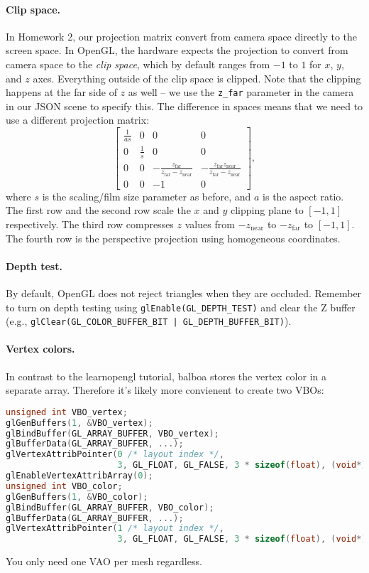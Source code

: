 \paragraph{Clip space.} In Homework 2, our projection matrix convert from camera space directly to the screen space. In OpenGL, the hardware expects the projection to convert from camera space to the \emph{clip space}, which by default ranges from $-1$ to $1$ for $x$, $y$, and $z$ axes. Everything outside of the clip space is clipped. Note that the clipping happens at the far side of $z$ as well -- we use the \lstinline{z_far} parameter in the camera in our JSON scene to specify this. The difference in spaces means that we need to use a different projection matrix:
\begin{equation}
\begin{bmatrix}
\frac{1}{as} & 0 & 0 & 0 \\
0 & \frac{1}{s} & 0 & 0 \\
0 & 0 & -\frac{z_{\text{far}}}{z_{\text{far}} - z_{\text{near}}} & -\frac{z_{\text{far}} z_{\text{near}}}{z_{\text{far}} - z_{\text{near}}} \\
0 & 0 & -1 & 0
\end{bmatrix},
\end{equation} 
where $s$ is the scaling/film size parameter as before, and $a$ is the aspect ratio. The first row and the second row scale the $x$ and $y$ clipping plane to $[-1, 1]$ respectively. The third row compresses $z$ values from $-z_{\text{near}}$ to $-z_{\text{far}}$ to $[-1, 1]$. The fourth row is the perspective projection using homogeneous coordinates.

\paragraph{Depth test.} By default, OpenGL does not reject triangles when they are occluded. Remember to turn on depth testing using \lstinline{glEnable(GL_DEPTH_TEST)} and clear the Z buffer (e.g., \lstinline{glClear(GL_COLOR_BUFFER_BIT | GL_DEPTH_BUFFER_BIT)}).

\paragraph{Vertex colors.} In contrast to the learnopengl tutorial, balboa stores the vertex color in a separate array. Therefore it's likely more convienent to create two VBOs:
\begin{lstlisting}[language=C++]
unsigned int VBO_vertex;
glGenBuffers(1, &VBO_vertex);
glBindBuffer(GL_ARRAY_BUFFER, VBO_vertex);
glBufferData(GL_ARRAY_BUFFER, ...);
glVertexAttribPointer(0 /* layout index */,
                      3, GL_FLOAT, GL_FALSE, 3 * sizeof(float), (void*)0);
glEnableVertexAttribArray(0);
unsigned int VBO_color;
glGenBuffers(1, &VBO_color);
glBindBuffer(GL_ARRAY_BUFFER, VBO_color);
glBufferData(GL_ARRAY_BUFFER, ...);
glVertexAttribPointer(1 /* layout index */,
                      3, GL_FLOAT, GL_FALSE, 3 * sizeof(float), (void*)0);
\end{lstlisting}
You only need one VAO per mesh regardless.

